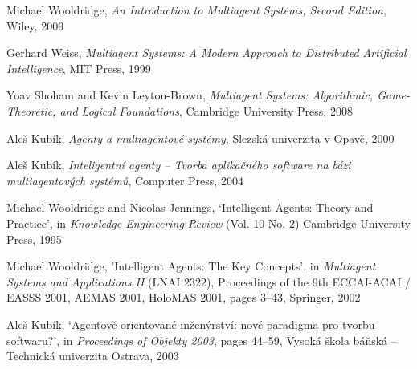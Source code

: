 
\begin{thebibliography}{99}


Michael Wooldridge,
\textit{An Introduction to Multiagent Systems, Second Edition},
Wiley, 2009

Gerhard Weiss,
\textit{Multiagent Systems: A Modern Approach to Distributed Artificial Intelligence},
MIT Press, 1999

Yoav Shoham and Kevin Leyton-Brown,
\textit{Multiagent Systems: Algorithmic, Game-Theoretic, and Logical Foundations},
Cambridge University Press, 2008

Aleš Kubík,
\textit{Agenty a multiagentové systémy},
Slezská univerzita v Opavě, 2000

Aleš Kubík,
\textit{Inteligentní agenty -- Tvorba aplikačného software na bázi multiagentových systémů},
Computer Press, 2004

Michael Wooldridge and Nicolas Jennings,
`Intelligent Agents: Theory and Practice',
in \textit{Knowledge Engineering Review} (Vol. 10 No. 2)
Cambridge University Press, 1995

Michael Wooldridge,
'Intelligent Agents: The Key Concepts',
in \textit{Multiagent Systems and Applications II} (LNAI 2322),
Proceedings of the 9th ECCAI-ACAI / EASSS 2001, AEMAS 2001, HoloMAS 2001,
pages 3--43,
Springer, 2002 

Aleš Kubík,
`Agentově-orientované inženýrství: nové paradigma pro tvorbu softwaru?',
in \textit{Proceedings of Objekty 2003},
pages 44--59,
Vysoká škola báňská – Technická univerzita Ostrava, 2003


\end{thebibliography}

